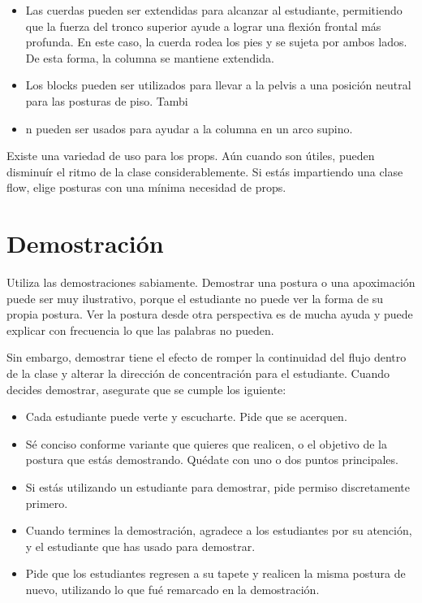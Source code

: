 \begin{itemize}
	\item Las cuerdas pueden ser extendidas para alcanzar al estudiante, permitiendo que la fuerza del tronco superior ayude a lograr una flexión frontal más profunda. En este caso, la cuerda rodea los pies y se sujeta por ambos lados. De esta forma, la columna se mantiene extendida.
	\item Los blocks pueden ser utilizados para llevar a la pelvis a una posición neutral para las posturas de piso. Tambi\item n pueden ser usados para ayudar a la columna en un arco supino.
\end{itemize}

Existe una variedad de uso para los props. Aún cuando son útiles, pueden disminuír el ritmo de la clase considerablemente. Si estás impartiendo una clase flow, elige posturas con una mínima necesidad de props.

\section{Demostración}
Utiliza las demostraciones sabiamente. Demostrar una postura o una apoximación puede ser muy ilustrativo, porque el estudiante no puede ver la forma de su propia postura. Ver la postura desde otra perspectiva es de mucha ayuda y puede explicar con frecuencia lo que las palabras no pueden.

Sin embargo, demostrar tiene el efecto de romper la continuidad del flujo dentro de la clase y alterar la dirección de concentración para el estudiante. Cuando decides demostrar, asegurate que se cumple los iguiente:

\begin{itemize}
	\item Cada estudiante puede verte y escucharte. Pide que se acerquen.
	\item S\'e conciso conforme variante que quieres que realicen, o el objetivo de la postura que estás demostrando. Qu\'edate con uno o dos puntos principales.
	\item Si estás utilizando un estudiante para demostrar, pide permiso discretamente primero.
	\item Cuando termines la demostración, agradece a los estudiantes por su atención, y el estudiante que has usado para demostrar.
	\item Pide que los estudiantes regresen a su tapete y realicen la misma postura de nuevo, utilizando lo que fu\'e remarcado en la demostración.
\end{itemize}

